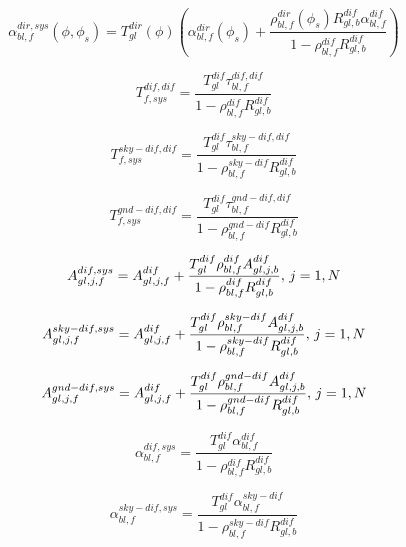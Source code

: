 \begin{equation}
\alpha_{bl,f}^{dir,sys}(\phi ,{\phi_s}) = T_{gl}^{dir}(\phi )\left( {\alpha_{bl,f}^{dir}({\phi_s}) + \frac{{\rho_{bl,f}^{dir}({\phi_s})R_{gl,b}^{dif}\alpha_{bl,f}^{dif}}}{{1 - \rho_{bl,f}^{dif}R_{gl,b}^{dif}}}} \right)
\end{equation}

\begin{equation}
T_{f,sys}^{dif,dif} = \frac{{T_{gl}^{dif}\tau_{bl,f}^{dif,dif}}}{{1 - \rho_{bl,f}^{dif}R_{gl,b}^{dif}}}
\end{equation}

\begin{equation}
T_{f,sys}^{sky - dif,dif} = \frac{{T_{gl}^{dif}\tau_{bl,f}^{sky - dif,dif}}}{{1 - \rho_{bl,f}^{sky - dif}R_{gl,b}^{dif}}}
\end{equation}

\begin{equation}
T_{f,sys}^{gnd - dif,dif} = \frac{{T_{gl}^{dif}\tau_{bl,f}^{gnd - dif,dif}}}{{1 - \rho_{bl,f}^{gnd - dif}R_{gl,b}^{dif}}}
\end{equation}

\begin{equation}
A_{gl,j,f}^{dif,sys} = A_{gl,j,f}^{dif} + \frac{{T_{gl}^{dif}\rho_{bl,f}^{dif}A_{gl,j,b}^{dif}}}{{1 - \rho_{bl,f}^{dif}R_{gl,b}^{dif}}}{\rm{,    }}~j = 1,N
\end{equation}

\begin{equation}
A_{gl,j,f}^{sky - dif,sys} = A_{gl,j,f}^{dif} + \frac{{T_{gl}^{dif}\rho_{bl,f}^{sky - dif}A_{gl,j,b}^{dif}}}{{1 - \rho_{bl,f}^{sky - dif}R_{gl,b}^{dif}}}{\rm{,    }}~j = 1,N
\end{equation}

\begin{equation}
A_{gl,j,f}^{gnd - dif,sys} = A_{gl,j,f}^{dif} + \frac{{T_{gl}^{dif}\rho_{bl,f}^{gnd - dif}A_{gl,j,b}^{dif}}}{{1 - \rho_{bl,f}^{gnd - dif}R_{gl,b}^{dif}}}{\rm{,    }}~j = 1,N
\end{equation}

\begin{equation}
\alpha_{bl,f}^{dif,sys} = \frac{{T_{gl}^{dif}\alpha_{bl,f}^{dif}}}{{1 - \rho_{bl,f}^{dif}R_{gl,b}^{dif}}}
\end{equation}

\begin{equation}
\alpha_{bl,f}^{sky - dif,sys} = \frac{{T_{gl}^{dif}\alpha_{bl,f}^{sky - dif}}}{{1 - \rho_{bl,f}^{sky - dif}R_{gl,b}^{dif}}}
\end{equation}


